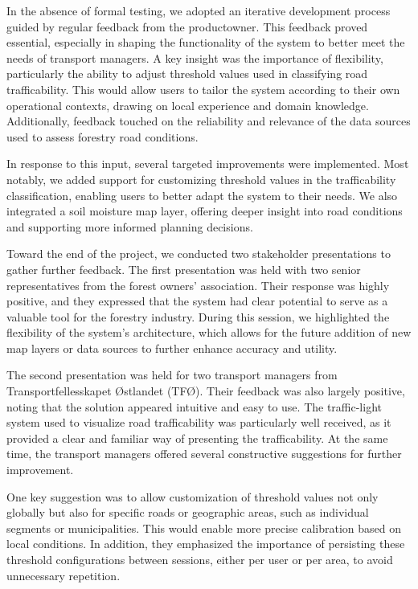 In the absence of formal testing, we adopted an iterative development process guided by regular feedback from the \gls{productowner}. This feedback proved essential, especially in shaping the functionality of the system to better meet the needs of transport managers. A key insight was the importance of flexibility, particularly the ability to adjust threshold values used in classifying road trafficability. This would allow users to tailor the system according to their own operational contexts, drawing on local experience and domain knowledge. Additionally, feedback touched on the reliability and relevance of the data sources used to assess forestry road conditions.

In response to this input, several targeted improvements were implemented. Most notably, we added support for customizing threshold values in the trafficability classification, enabling users to better adapt the system to their needs. We also integrated a soil moisture map layer, offering deeper insight into road conditions and supporting more informed planning decisions.

Toward the end of the project, we conducted two stakeholder presentations to gather further feedback. The first presentation was held with two senior representatives from the forest owners' association. Their response was highly positive, and they expressed that the system had clear potential to serve as a valuable tool for the forestry industry. During this session, we highlighted the flexibility of the system's architecture, which allows for the future addition of new map layers or data sources to further enhance accuracy and utility.

The second presentation was held for two transport managers from Transportfellesskapet Østlandet (TFØ). Their feedback was also largely positive, noting that the solution appeared intuitive and easy to use. The traffic-light system used to visualize road trafficability was particularly well received, as it provided a clear and familiar way of presenting the trafficability. At the same time, the transport managers offered several constructive suggestions for further improvement.

One key suggestion was to allow customization of threshold values not only globally but also for specific roads or geographic areas, such as individual segments or municipalities. This would enable more precise calibration based on local conditions. In addition, they emphasized the importance of persisting these threshold configurations between sessions, either per user or per area, to avoid unnecessary repetition.

